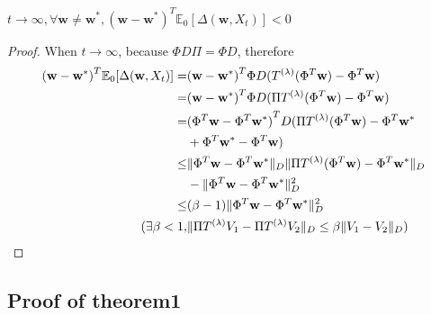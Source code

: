 \begin{lem}
    $ t \rightarrow \infty, \forall \mathbf{w} \ne \mathbf{w}^*, 
    {( \mathbf{w} - \mathbf{w^*})}^T \mathbb{E}_0 [ \Delta( \mathbf{w}, X_t ) ] < 0 $ 
    \begin{proof}
        When $t \rightarrow \infty$, because $\Phi D \Pi = \Phi D$, therefore \\
        \begin{equation}
            \begin{aligned}
                {( \mathbf{w} - \mathbf{w^*})}^T \mathbb{E}_0 [ \Delta( \mathbf{w}, X_t ) ]
                =& {( \mathbf{w} - \mathbf{w^*})}^T \Phi D (T^{(\lambda)}(\Phi^T \mathbf{w}) - \Phi^T \mathbf{w}) \\
                =& {( \mathbf{w} - \mathbf{w^*})}^T \Phi D (\Pi T^{(\lambda)}(\Phi^T \mathbf{w}) - \Phi^T \mathbf{w}) \\
                =& {( \Phi^T \mathbf{w} - \Phi^T \mathbf{w^*})}^T D 
                (\Pi T^{(\lambda)}(\Phi^T \mathbf{w}) - \Phi^T \mathbf{w^*}\\
                 &+ \Phi^T \mathbf{w}^* - \Phi^T \mathbf{w}) \\
                \le& \Arrowvert  \Phi^T \mathbf{w} - \Phi^T \mathbf{w^*} \Arrowvert_D
                \Arrowvert \Pi T^{(\lambda)}(\Phi^T \mathbf{w}) - \Phi^T \mathbf{w^*} \Arrowvert_D\\
                   &- \Arrowvert  \Phi^T \mathbf{w} - \Phi^T \mathbf{w^*} \Arrowvert^2_D\\
                \le& (\beta - 1)\Arrowvert  \Phi^T \mathbf{w} - \Phi^T \mathbf{w^*} \Arrowvert^2_D\\
                ( \exists \beta < 1, &
                   \Arrowvert \Pi T^{(\lambda)} V_1 - \Pi T^{(\lambda)} V_2 \Arrowvert_D
                   \le \beta \Arrowvert V_1 - V_2 \Arrowvert_D)
            \end{aligned}
        \end{equation}
    \end{proof}
\end{lem}

\subsection{Proof of theorem1}%
\label{sub:proof_of_theorem1}

